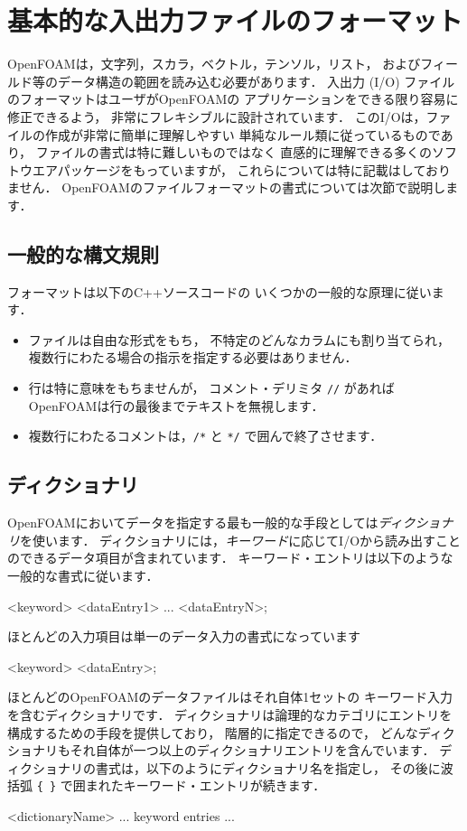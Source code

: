\section{基本的な入出力ファイルのフォーマット}
\label{sec:4.2}
%
%
OpenFOAMは，文字列，スカラ，ベクトル，テンソル，リスト，
およびフィールド等のデータ構造の範囲を読み込む必要があります．
入出力 (I/O) ファイルのフォーマットはユーザがOpenFOAMの
アプリケーションをできる限り容易に修正できるよう，
非常にフレキシブルに設計されています．
このI/Oは，ファイルの作成が非常に簡単に理解しやすい
単純なルール類に従っているものであり，
ファイルの書式は特に難しいものではなく
直感的に理解できる多くのソフトウエアパッケージをもっていますが，
これらについては特に記載はしておりません．
OpenFOAMのファイルフォーマットの書式については次節で説明します．


\subsection{一般的な構文規則}
\label{ssec:4.2.1}
フォーマットは以下のC++ソースコードの
いくつかの一般的な原理に従います．
\begin{itemize}
 \item ファイルは自由な形式をもち，
       不特定のどんなカラムにも割り当てられ，
       複数行にわたる場合の指示を指定する必要はありません．
 \item 行は特に意味をもちませんが，
%
%
       コメント・デリミタ \verb|//| があればOpenFOAMは行の最後までテキストを無視します．
 \item 複数行にわたるコメントは，\verb|/*| と \verb|*/| で囲んで終了させます．
\end{itemize}


\subsection{ディクショナリ}
\label{ssec:4.2.2}
OpenFOAMにおいてデータを指定する最も一般的な手段としては\emph{ディクショナリ}を使います．
ディクショナリには，\emph{キーワード}に応じてI/Oから読み出すことのできるデータ項目が含まれています．
キーワード・エントリは以下のような一般的な書式に従います．
\begin{OFverbatim}[file]
<keyword>  <dataEntry1> ... <dataEntryN>;
\end{OFverbatim}
ほとんどの入力項目は単一のデータ入力の書式になっています
\begin{OFverbatim}[file]
<keyword>  <dataEntry>;
\end{OFverbatim}
ほとんどのOpenFOAMのデータファイルはそれ自体1セットの
キーワード入力を含むディクショナリです．
ディクショナリは論理的なカテゴリにエントリを構成するための手段を提供しており，
階層的に指定できるので，
どんなディクショナリもそれ自体が一つ以上のディクショナリエントリを含んでいます．
ディクショナリの書式は，以下のようにディクショナリ名を指定し，
その後に波括弧 \verb|{ }| で囲まれたキーワード・エントリが続きます．
\begin{OFverbatim}[file]
<dictionaryName>
{
    ... keyword entries ...
}
\end{OFverbatim}


